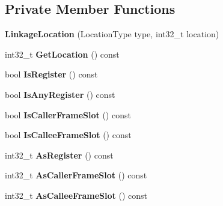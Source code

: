 \subsection*{Private Member Functions}
\begin{DoxyCompactItemize}
\item 
{\bfseries Linkage\+Location} (Location\+Type type, int32\+\_\+t location)\hypertarget{classv8_1_1internal_1_1compiler_1_1_linkage_location_a9748475bf504766eddc3be23e7dd2232}{}\label{classv8_1_1internal_1_1compiler_1_1_linkage_location_a9748475bf504766eddc3be23e7dd2232}

\item 
int32\+\_\+t {\bfseries Get\+Location} () const \hypertarget{classv8_1_1internal_1_1compiler_1_1_linkage_location_a8d541303b9479f274aa18f54ebf3eb65}{}\label{classv8_1_1internal_1_1compiler_1_1_linkage_location_a8d541303b9479f274aa18f54ebf3eb65}

\item 
bool {\bfseries Is\+Register} () const \hypertarget{classv8_1_1internal_1_1compiler_1_1_linkage_location_a26f37fe1e6c5cc8c3d2d26235278c085}{}\label{classv8_1_1internal_1_1compiler_1_1_linkage_location_a26f37fe1e6c5cc8c3d2d26235278c085}

\item 
bool {\bfseries Is\+Any\+Register} () const \hypertarget{classv8_1_1internal_1_1compiler_1_1_linkage_location_aabcb48d2fb4b50023dfc45b240483238}{}\label{classv8_1_1internal_1_1compiler_1_1_linkage_location_aabcb48d2fb4b50023dfc45b240483238}

\item 
bool {\bfseries Is\+Caller\+Frame\+Slot} () const \hypertarget{classv8_1_1internal_1_1compiler_1_1_linkage_location_a16ea72efcb368a3267c0cc33afca8e5a}{}\label{classv8_1_1internal_1_1compiler_1_1_linkage_location_a16ea72efcb368a3267c0cc33afca8e5a}

\item 
bool {\bfseries Is\+Callee\+Frame\+Slot} () const \hypertarget{classv8_1_1internal_1_1compiler_1_1_linkage_location_a5982374a03e227f92a9398822e5dcc8a}{}\label{classv8_1_1internal_1_1compiler_1_1_linkage_location_a5982374a03e227f92a9398822e5dcc8a}

\item 
int32\+\_\+t {\bfseries As\+Register} () const \hypertarget{classv8_1_1internal_1_1compiler_1_1_linkage_location_a199fc6197a5142b7045d6748e407ec20}{}\label{classv8_1_1internal_1_1compiler_1_1_linkage_location_a199fc6197a5142b7045d6748e407ec20}

\item 
int32\+\_\+t {\bfseries As\+Caller\+Frame\+Slot} () const \hypertarget{classv8_1_1internal_1_1compiler_1_1_linkage_location_afc1d28b2035b587e09e042e980616a45}{}\label{classv8_1_1internal_1_1compiler_1_1_linkage_location_afc1d28b2035b587e09e042e980616a45}

\item 
int32\+\_\+t {\bfseries As\+Callee\+Frame\+Slot} () const \hypertarget{classv8_1_1internal_1_1compiler_1_1_linkage_location_a62d0dfe969bbd1e922eab6360fc4b8e0}{}\label{classv8_1_1internal_1_1compiler_1_1_linkage_location_a62d0dfe969bbd1e922eab6360fc4b8e0}

\end{DoxyCompactItemize}
